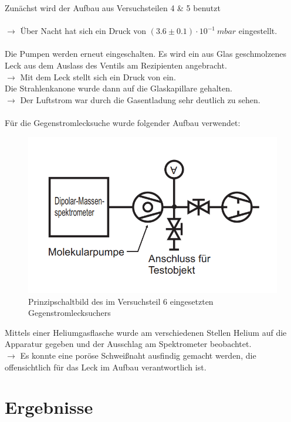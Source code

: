 \documentclass[12pt, a4paper]{scrartcl}
\begin{document}
		Zunächst wird der Aufbau aus Versuchsteilen 4 \& 5 benutzt\\\\	
		$\rightarrow$ Über Nacht hat sich ein Druck von 
        $(3.6\pm0.1)\cdot 10^{-1}\ mbar$
        eingestellt.\\\\
		Die Pumpen werden erneut eingeschalten. Es wird ein aus Glas geschmolzenes Leck aus dem Auslass des Ventils am Rezipienten angebracht.\\
		$\rightarrow$ Mit dem Leck stellt sich ein Druck von 
        ein.\\		
		Die Strahlenkanone wurde dann auf die Glaskapillare gehalten.\\
		$\rightarrow$ Der Luftstrom war durch die Gasentladung sehr deutlich zu sehen.\\\\		
		Für die Gegenstromlecksuche wurde folgender Aufbau verwendet:
		
		\begin{figure}[H]
			\centering
			\includegraphics[width=.3\paperwidth]{aufbau262}
			\caption{Prinzipschaltbild des im Versuchsteil 6 eingesetzten Gegenstromlecksuchers}
			\label{fig:anord6}
		\end{figure}
		Mittels einer Heliumgasflasche wurde am verschiedenen Stellen Helium auf die Apparatur gegeben und der Ausschlag am Spektrometer beobachtet.\\
		$\rightarrow$ Es konnte eine poröse Schweißnaht ausfindig gemacht werden, die offensichtlich für das Leck im Aufbau verantwortlich ist.

	\section{Ergebnisse}
\end{document}
